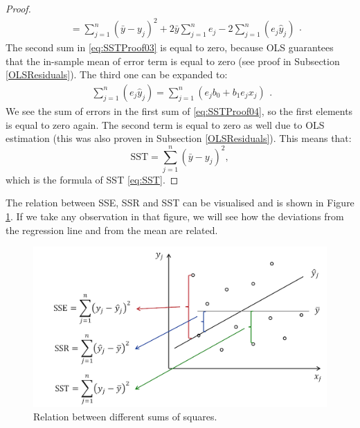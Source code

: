 \documentclass[
]{book}
\theoremstyle{definition}
\theoremstyle{definition}
\theoremstyle{definition}
\theoremstyle{definition}
\theoremstyle{remark}
\begin{document}
\begin{proof}
\begin{equation}
\begin{aligned}
        &= \sum_{j=1}^n (\bar{y} - y_j)^2 + 2 \bar{y} \sum_{j=1}^n e_j - 2 \sum_{j=1}^n \left(e_j \hat{y}_j \right)
    \end{aligned} .
    \label{eq:SSTProof03}
\end{equation}
The second sum in \eqref{eq:SSTProof03} is equal to zero, because OLS guarantees that the in-sample mean of error term is equal to zero (see proof in Subsection \ref{OLSResiduals}). The third one can be expanded to:
\begin{equation}
    \begin{aligned}
        \sum_{j=1}^n \left(e_j \hat{y}_j \right) = \sum_{j=1}^n \left(e_j b_0 + b_1 e_j x_j \right)
    \end{aligned} .
    \label{eq:SSTProof04}
\end{equation}
We see the sum of errors in the first sum of \eqref{eq:SSTProof04}, so the first elements is equal to zero again. The second term is equal to zero as well due to OLS estimation (this was also proven in Subsection \ref{OLSResiduals}). This means that:
\begin{equation}
    \mathrm{SST} =  \sum_{j=1}^n (\bar{y} - y_j)^2 ,
    \label{eq:SSTProof05}
\end{equation}
which is the formula of SST \eqref{eq:SST}.
\end{proof}

The relation between SSE, SSR and SST can be visualised and is shown in Figure \ref{fig:sumsSquaredRelation}. If we take any observation in that figure, we will see how the deviations from the regression line and from the mean are related.

\begin{figure}
\centering
\includegraphics{images/09-SLR-SSE-white.png}
\caption{\label{fig:sumsSquaredRelation}Relation between different sums of squares.}
\end{figure}
\end{document}
